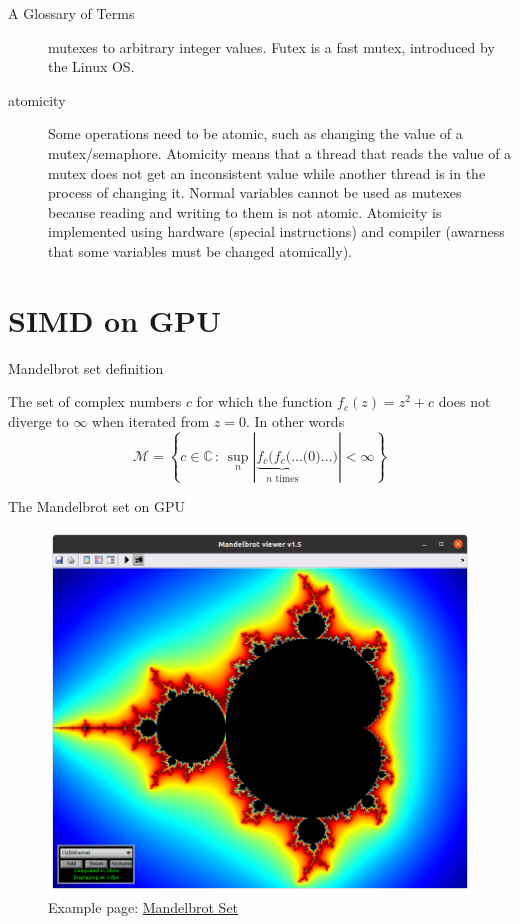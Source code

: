 \documentclass[pdflatex,colorlinks,landscape]{beamer}
\renewcommand\emph[1]{{\color{magenta}#1}}
\begin{document}
\begin{frame}[allowframebreaks]{A Glossary of Terms}
\begin{description}
    mutexes to arbitrary integer values. \emph{Futex} is a \emph{fast mutex},
    introduced by the Linux OS.
  \item[atomicity] Some operations need to be atomic, such as changing
    the value of a mutex/semaphore. Atomicity means that a thread that
    reads the value of a mutex does not get an inconsistent value
    while another thread is {\color{red} in the process of changing it}.
    Normal variables cannot be used as mutexes because reading
    and writing to them {\color{red}is not atomic}. Atomicity is implemented
    using hardware (special instructions) and compiler (awarness that some
    variables must be changed atomically).
  \end{description}
\end{frame}

\section{SIMD on GPU}

\begin{frame}{Mandelbrot set definition}
  \begin{definition}  The set of complex numbers $c$
    for which the function $f_c(z) = z^2 + c$ does not diverge to $\infty$
    when iterated from $z = 0$. In other words
    \begin{equation*}
      \mathcal{M} = \left\{ c\in\mathbb{C}\,:\,
      \sup_{n}\left|\underbrace{f_c(f_c(\ldots(}_{\text{$n$ times}} 0)\ldots)\right| < \infty
      \right\}
    \end{equation*}
  \end{definition}
\end{frame}

\begin{frame}{The Mandelbrot set on GPU}
  \begin{figure}
    \includegraphics[width=.8\textwidth]{Mandelbrot.png}
    \caption{Example page: \href{https://www.mathworks.com/help/parallel-computing/illustrating-three-approaches-to-gpu-computing-the-mandelbrot-set.html}{Mandelbrot Set}}
  \end{figure}
\end{frame}
\end{document}
